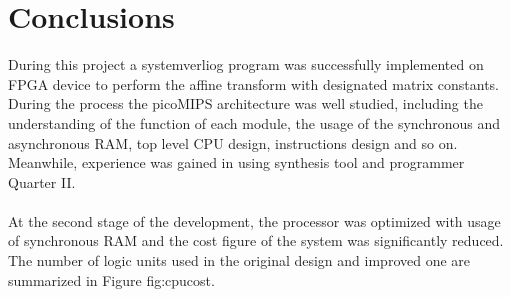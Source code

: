 

\section{Conclusions} \label{Section: Conclusions}

During this project a systemverliog program was successfully implemented on FPGA device to perform the affine transform with designated matrix constants. During the process the picoMIPS architecture was well studied, including the understanding of the function of each module, the usage of the synchronous and asynchronous RAM, top level CPU design, instructions design and so on. Meanwhile, experience was gained in using synthesis tool and programmer Quarter II.\\\\
At the second stage of the development, the processor was optimized with usage of synchronous RAM and the cost figure of the system was significantly reduced. The number of logic units used in the original design and improved one are summarized in Figure {fig:cpucost}. 

